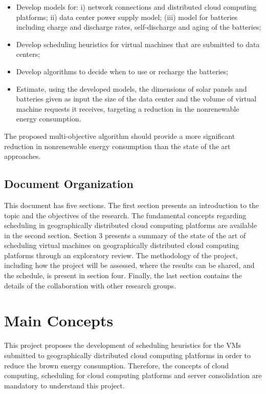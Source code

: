 \documentclass[12pt,a4paper]{article}
\begin{document}
\begin{itemize}

\item Develop models for: i) network connections and distributed cloud computing platforms; ii) data center power supply model; (iii) model for batteries including charge and discharge rates, self-discharge and aging of the batteries;

\item Develop scheduling heuristics for virtual machines that are submitted to data centers;

\item Develop algorithms to decide when to use or recharge the batteries;

\item Estimate, using the developed models, the dimensions of solar panels and batteries given as input the size of the data center and the volume of virtual machine requests it receives, targeting a reduction in the nonrenewable energy consumption.

\end{itemize}

The proposed multi-objective algorithm should provide a more significant reduction in nonrenewable energy consumption than the state of the art approaches.

\subsection{Document Organization}

This document has five sections. The first section presents an introduction to the topic and the objectives of the research. The fundamental concepts regarding scheduling in geographically distributed cloud computing platforms are available in the second section. Section 3 presents a summary of the state of the art of scheduling virtual machines on geographically distributed cloud computing platforms through an exploratory review. The methodology of the project, including how the project will be assessed, where the results can be shared, and the schedule, is present in section four. Finally, the last section contains the details of the collaboration with other research groups.


\section{Main Concepts}

This project proposes the development of scheduling heuristics for the VMs submitted to geographically distributed cloud computing platforms in order to reduce the brown energy consumption. Therefore, the concepts of cloud computing, scheduling for cloud computing platforms and server consolidation are mandatory to understand this project. 
\end{document}
